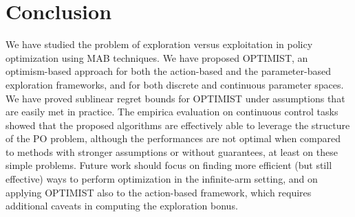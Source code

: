 \documentclass{article}
\begin{document}
\section{Conclusion}\label{sec:end}
We have studied the problem of exploration versus exploitation in policy optimization using MAB techniques. We have proposed OPTIMIST, an optimism-based approach for both the action-based and the parameter-based exploration frameworks, and for both discrete and continuous parameter spaces. We have proved sublinear regret bounds for OPTIMIST under assumptions that are easily met in practice. The empirica evaluation on continuous control tasks showed that the proposed algorithms are effectively able to leverage the structure of the PO problem, although the performances are not optimal when compared to methods with stronger assumptions or without guarantees, at least on these simple problems.
Future work should focus on finding more efficient (but still effective) ways to perform optimization in the infinite-arm setting, and on applying OPTIMIST also to the action-based framework, which requires additional caveats in computing the exploration bonus.

%
%





\clearpage
\onecolumn
\appendix
\end{document}
